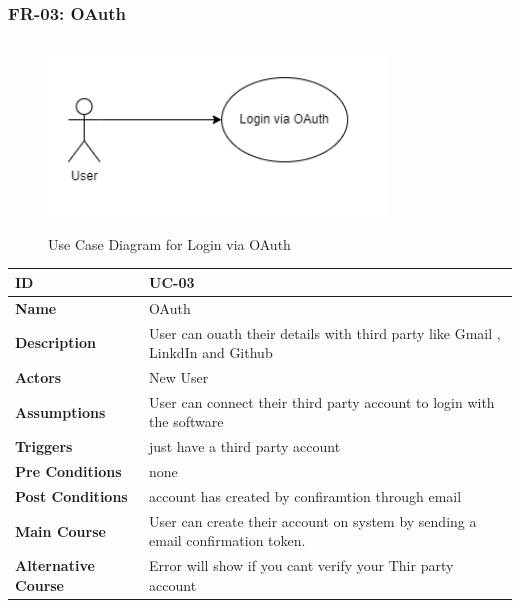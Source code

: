     \subsubsection{FR-03: OAuth}
    \begin{figure}[H]
        \includegraphics[height=5cm, width=0.8\textwidth]{./diagrams/Use Case/u3.png}
        \centering 
        \caption{Use Case Diagram for Login via OAuth}
        \label{Usecase1}
        \end{figure}
        
    \begin{center}
        \begin{tabularx}{\textwidth}{|l|X|}
            \hline
            \textbf{ID} & UC-03 \\
            \hline
            \textbf{Name} & OAuth \\
            \hline
            \textbf{Description} & User can ouath their details with third party like Gmail , LinkdIn and Github \\
            \hline
            \textbf{Actors} & New User \\
            \hline
            \textbf{Assumptions} & User can connect their third party account to login with the software \\
            \hline
            \textbf{Triggers} & just have a third party account  \\
            \hline
            \textbf{Pre Conditions} & none \\
            \hline
            \textbf{Post Conditions} & account has created by confiramtion through email  \\
            \hline
            \textbf{Main Course} & User can create their account on system by sending a email confirmation token. \\
            \hline
            \textbf{Alternative Course} & Error will show if you cant verify your Thir party account \\
            \hline
            
        \end{tabularx}
    \end{center}
    \newpage
    

